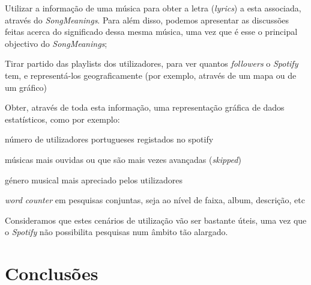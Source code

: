 \documentclass[twocolumn,twoside,11pt,a4paper]{article}
\begin{document}
\begin{compactitem}
  \item Utilizar a informação de uma música para obter a letra (\textit{lyrics}) a
    esta associada, através do \textit{SongMeanings}. Para além disso, podemos
    apresentar as discussões feitas acerca do significado dessa mesma música, uma vez
    que é esse o principal objectivo do \textit{SongMeanings};
  \item Tirar partido das playlists dos utilizadores, para ver quantos \textit{followers}
    o \textit{Spotify} tem, e representá-los geograficamente (por exemplo, através de
      um mapa ou de um gráfico)
  \item Obter, através de toda esta informação, uma representação gráfica de dados
    estatísticos, como por exemplo:
    \begin{compactitem}
      \item número de utilizadores portugueses registados no spotify
      \item músicas mais ouvidas ou que são mais vezes avançadas (\textit{skipped})
      \item género musical mais apreciado pelos utilizadores
      \item \textit{word counter} em pesquisas conjuntas, seja ao nível de faixa, album,
        descrição, etc
    \end{compactitem}
\end{compactitem}

Consideramos que estes cenários de utilização vão ser bastante úteis, uma vez que o
\textit{Spotify} não possibilita pesquisas num âmbito tão alargado.


\section{Conclusões}\label{sec:conclusions}



%
%
%
%

\end{document}

